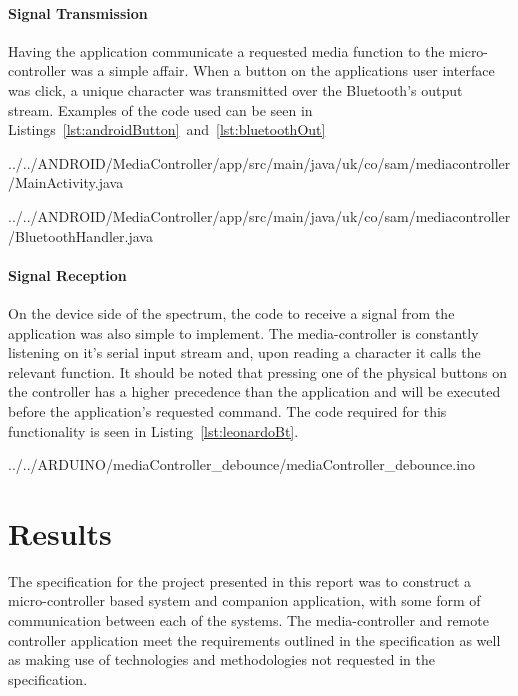 \documentclass{article}
\begin{document}
			\paragraph{Signal Transmission}
			Having the application communicate a requested media function to the micro-controller was a simple affair. When a button on the applications user interface was click, a unique character was transmitted over the Bluetooth's output stream. Examples of the code used can be seen in Listings~\ref{lst:androidButton}~and~\ref{lst:bluetoothOut}
			
			 {../../ANDROID/MediaController/app/src/main/java/uk/co/sam/mediacontroller/MainActivity.java}
			
			 {../../ANDROID/MediaController/app/src/main/java/uk/co/sam/mediacontroller/BluetoothHandler.java}
			
			\paragraph{Signal Reception}
			On the device side of the spectrum, the code to receive a signal from the application was also simple to implement. The media-controller is constantly listening on it's serial input stream and, upon reading a character it calls the relevant function. It should be noted that pressing one of the physical buttons on the controller has a higher precedence than the application and will be executed before the application's requested command. The code required for this functionality is seen in Listing~\ref{lst:leonardoBt}.
			
			 {../../ARDUINO/mediaController_debounce/mediaController_debounce.ino}
			
	\newpage
			
	\section{Results}
		The specification for the project presented in this report was to construct a micro-controller based system and companion application, with some form of communication between each of the systems. The media-controller and remote controller application meet the requirements outlined in the specification as well as making use of technologies and methodologies not requested in the specification.
			
\end{document}
